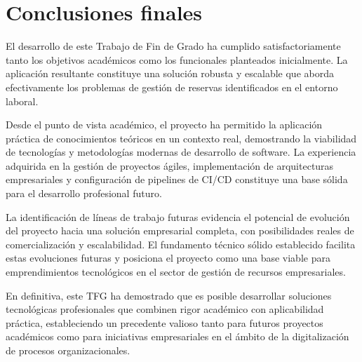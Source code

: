 \section{Conclusiones finales}\label{conclusiones-finales}
El desarrollo de este Trabajo de Fin de Grado ha cumplido satisfactoriamente tanto los objetivos académicos como los funcionales planteados inicialmente. La aplicación resultante constituye una solución robusta y escalable que aborda efectivamente los problemas de gestión de reservas identificados en el entorno laboral.

Desde el punto de vista académico, el proyecto ha permitido la aplicación práctica de conocimientos teóricos en un contexto real, demostrando la viabilidad de tecnologías y metodologías modernas de desarrollo de software. La experiencia adquirida en la gestión de proyectos ágiles, implementación de arquitecturas empresariales y configuración de pipelines de CI/CD constituye una base sólida para el desarrollo profesional futuro.

La identificación de líneas de trabajo futuras evidencia el potencial de evolución del proyecto hacia una solución empresarial completa, con posibilidades reales de comercialización y escalabilidad. El fundamento técnico sólido establecido facilita estas evoluciones futuras y posiciona el proyecto como una base viable para emprendimientos tecnológicos en el sector de gestión de recursos empresariales.

En definitiva, este TFG ha demostrado que es posible desarrollar soluciones tecnológicas profesionales que combinen rigor académico con aplicabilidad práctica, estableciendo un precedente valioso tanto para futuros proyectos académicos como para iniciativas empresariales en el ámbito de la digitalización de procesos organizacionales.
